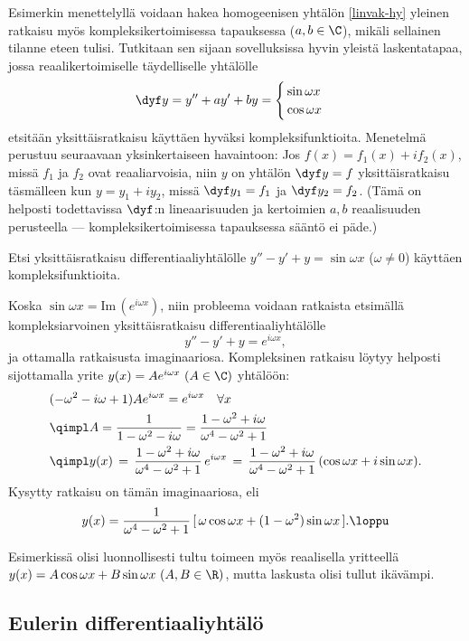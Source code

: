 Esimerkin menettelyllä voidaan hakea homogeenisen yhtälön \eqref{linvak-hy} yleinen ratkaisu
myös kompleksikertoimisessa tapauksessa ($a,b\in\C$), mikäli sellainen tilanne eteen tulisi.
Tutkitaan sen sijaan sovelluksissa hyvin yleistä laskentatapaa, jossa reaalikertoimiselle
täydelliselle yhtälölle
\[
\dyf y = y''+ay'+by = \begin{cases} \,\sin\omega x \\ \,\cos\omega x \end{cases}
\]
etsitään yksittäisratkaisu käyttäen hyväksi kompleksifunktioita. Menetelmä perustuu seuraavaan
yksinkertaiseen havaintoon: Jos $f(x)=f_1(x)+if_2(x)$, missä $f_1$ ja $f_2$ ovat reaaliarvoisia,
niin $y$ on yhtälön $\dyf y=f$ yksittäisratkaisu täsmälleen kun $y=y_1+iy_2$, missä
$\dyf y_1=f_1$ ja $\dyf y_2=f_2$. (Tämä on helposti todettavissa $\dyf$:n lineaarisuuden ja
kertoimien $a,b$ reaalisuuden perusteella --- kompleksikertoimisessa tapauksessa sääntö ei 
päde.)
\begin{Exa} Etsi yksittäisratkaisu differentiaaliyhtälölle $y''-y'+y=\sin\omega x$ 
($\omega\neq 0$) käyttäen kompleksifunktioita.
\end{Exa}
\ratk Koska $\sin \omega x = \text{Im} \, (e^{i\omega x})$, niin probleema voidaan ratkaista
etsimällä kompleksiarvoinen yksittäisratkaisu differentiaaliyhtälölle
\[
y''-y'+y=e^{i\omega x},
\]
ja ottamalla ratkaisusta imaginaariosa. Kompleksinen ratkaisu löytyy helposti sijottamalla
yrite $y(x)=Ae^{i\omega x}\ (A\in\C)$ yhtälöön:
\begin{align*}
     &(-\omega^2-i\omega+1)Ae^{i\omega x}=e^{i\omega x}\quad\forall x \\
     &\qimpl A=\frac{1}{1-\omega^2-i\omega}=\frac{1-\omega^2+i\omega}{\omega^4-\omega^2+1} \\
     &\qimpl y(x) \,=\, \frac{1-\omega^2+i\omega}{\omega^4-\omega^2+1}\,e^{i\omega x}
          \,=\, \frac{1-\omega^2+i\omega}{\omega^4-\omega^2+1}\,(\cos\omega x + i\sin\omega x).
\end{align*}
Kysytty ratkaisu on tämän imaginaariosa, eli
\[
y(x)=\frac{1}{\omega^4-\omega^2+1}\,[\,\omega\cos\omega x + (1-\omega^2)\sin\omega x\,]. \loppu
\]

Esimerkissä olisi luonnollisesti tultu toimeen myös reaalisella yritteellä 
$y(x)=A\cos\omega x+B\sin\omega x\ (A,B\in\R)$, mutta laskusta olisi tullut ikävämpi.

\subsection*{Eulerin differentiaaliyhtälö}

